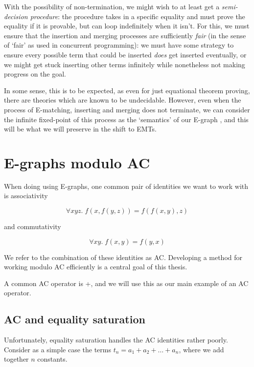 \documentclass[12pt,a4paper,twoside,openright]{report}
\numberwithin{equation}{chapter}		%
\numberwithin{figure}{chapter}			%
\numberwithin{table}{chapter}			%
\theoremstyle{definition}
\theoremstyle{plain}
\begin{document}
With the possibility of non-termination, we might wish to at least get a \emph{semi-decision procedure}: the procedure takes in a specific equality and must prove the equality if it is provable, but can loop indefinitely when it isn't. For this, we must ensure that the insertion and merging processes are sufficiently \emph{fair} (in the sense of `fair' as used in concurrent programming): we must have some strategy to ensure every possible term that could be inserted \emph{does} get inserted eventually, or we might get stuck inserting other terms infinitely while nonetheless not making progress on the goal.

In some sense, this is to be expected, as even for just equational theorem proving, there are theories which are known to be undecidable. However, even when the process of E-matching, inserting and merging does not terminate, we can consider the infinite fixed-point of this process as the `semantics' of our E-graph \citep{suciu_semantic_2025}, and this will be what we will preserve in the shift to EMTs.

\chapter{E-graphs modulo AC} \label{acegg}
When doing using E-graphs, one common pair of identities we want to work with is associativity

\begin{equation}
	\label{assocdef} \forall x y z.\; f(x, f(y, z)) = f(f(x, y), z)
\end{equation}

and commutativity

\begin{equation}
	\label{commdef} \forall x y.\; f(x, y) = f(y, x)
\end{equation}

We refer to the combination of these identities as AC. Developing a method for working modulo AC efficiently is a central goal of this thesis.

A common AC operator is +, and we will use this as our main example of an AC operator.

\section{AC and equality saturation}
Unfortunately, equality saturation handles the AC identities rather poorly. Consider as a simple case the terms $t_n = a_1 + a_2 + \ldots + a_n$, where we add together $n$ constants.
\end{document}
